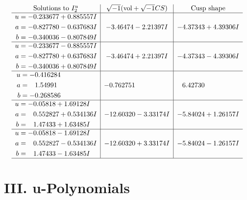\documentclass[1p]{elsarticle_modified}
\theoremstyle{definition}
\newcommand{\I}{\sqrt{-1}}
\begin{document}
$$\begin{array}{c|c|c}  
\text{Solutions to }I^u_{2}& \I (\text{vol} + \sqrt{-1}CS) & \text{Cusp shape}\\
 \hline 
\begin{aligned}
u &= -0.233677 + 0.885557 I \\
a &= -0.827780 - 0.637683 I \\
b &= -0.340036 - 0.807849 I\end{aligned}
 & -3.46474 - 2.21397 I & -4.37343 + 4.39306 I \\ \hline\begin{aligned}
u &= -0.233677 - 0.885557 I \\
a &= -0.827780 + 0.637683 I \\
b &= -0.340036 + 0.807849 I\end{aligned}
 & -3.46474 + 2.21397 I & -4.37343 - 4.39306 I \\ \hline\begin{aligned}
u &= -0.416284\phantom{ +0.000000I} \\
a &= \phantom{-}1.54991\phantom{ +0.000000I} \\
b &= -0.268586\phantom{ +0.000000I}\end{aligned}
 & -0.762751\phantom{ +0.000000I} & \phantom{-}6.42730\phantom{ +0.000000I} \\ \hline\begin{aligned}
u &= -0.05818 + 1.69128 I \\
a &= \phantom{-}0.552827 + 0.534136 I \\
b &= \phantom{-}1.47433 + 1.63485 I\end{aligned}
 & -12.60320 - 3.33174 I & -5.84024 + 1.26157 I \\ \hline\begin{aligned}
u &= -0.05818 - 1.69128 I \\
a &= \phantom{-}0.552827 - 0.534136 I \\
b &= \phantom{-}1.47433 - 1.63485 I\end{aligned}
 & -12.60320 + 3.33174 I & -5.84024 - 1.26157 I\\
 \hline 
 \end{array}$$\newpage
\newpage\renewcommand{\arraystretch}{1}
\centering \section*{ III. u-Polynomials}
\end{document}

